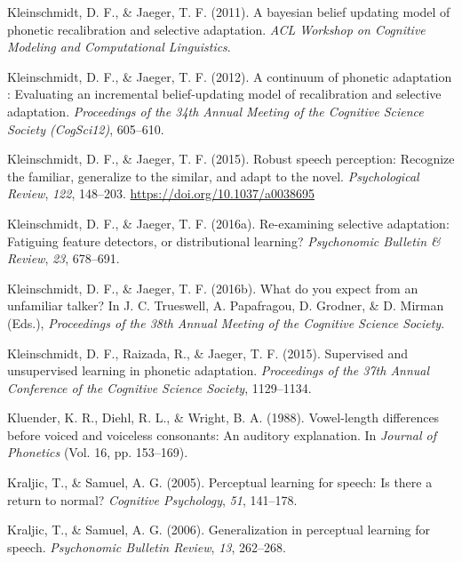 \documentclass[
  11pt,
  english,
  man,floatsintext]{apa6}
\newlength{\cslhangindent}
\newlength{\cslentryspacingunit} %
\newenvironment{CSLReferences}[2] %
 {%
  \setlength{\parindent}{0pt}
  \ifodd #1
  \let\oldpar\par
  \def\par{\hangindent=\cslhangindent\oldpar}
  \fi
  \setlength{\parskip}{#2\cslentryspacingunit}
 }%
 {}
\begin{document}
\begin{CSLReferences}{1}{0}
\leavevmode{}%
Kleinschmidt, D. F., \& Jaeger, T. F. (2011). A bayesian belief updating model of phonetic recalibration and selective adaptation. \emph{ACL Workshop on Cognitive Modeling and Computational Linguistics}.

\leavevmode{}%
Kleinschmidt, D. F., \& Jaeger, T. F. (2012). A continuum of phonetic adaptation : Evaluating an incremental belief-updating model of recalibration and selective adaptation. \emph{Proceedings of the 34th Annual Meeting of the Cognitive Science Society (CogSci12)}, 605--610.

\leavevmode{}%
Kleinschmidt, D. F., \& Jaeger, T. F. (2015). Robust speech perception: Recognize the familiar, generalize to the similar, and adapt to the novel. \emph{Psychological Review}, \emph{122}, 148--203. \url{https://doi.org/10.1037/a0038695}

\leavevmode{}%
Kleinschmidt, D. F., \& Jaeger, T. F. (2016a). Re-examining selective adaptation: Fatiguing feature detectors, or distributional learning? \emph{Psychonomic Bulletin \& Review}, \emph{23}, 678--691.

\leavevmode{}%
Kleinschmidt, D. F., \& Jaeger, T. F. (2016b). What do you expect from an unfamiliar talker? In J. C. Trueswell, A. Papafragou, D. Grodner, \& D. Mirman (Eds.), \emph{Proceedings of the 38th Annual Meeting of the Cognitive Science Society}.

\leavevmode{}%
Kleinschmidt, D. F., Raizada, R., \& Jaeger, T. F. (2015). Supervised and unsupervised learning in phonetic adaptation. \emph{Proceedings of the 37th Annual Conference of the Cognitive Science Society}, 1129--1134.

\leavevmode{}%
Kluender, K. R., Diehl, R. L., \& Wright, B. A. (1988). Vowel-length differences before voiced and voiceless consonants: An auditory explanation. In \emph{Journal of Phonetics} (Vol. 16, pp. 153--169).

\leavevmode{}%
Kraljic, T., \& Samuel, A. G. (2005). Perceptual learning for speech: Is there a return to normal? \emph{Cognitive Psychology}, \emph{51}, 141--178.

\leavevmode{}%
Kraljic, T., \& Samuel, A. G. (2006). Generalization in perceptual learning for speech. \emph{Psychonomic Bulletin Review}, \emph{13}, 262--268.


\end{CSLReferences}
\end{document}
